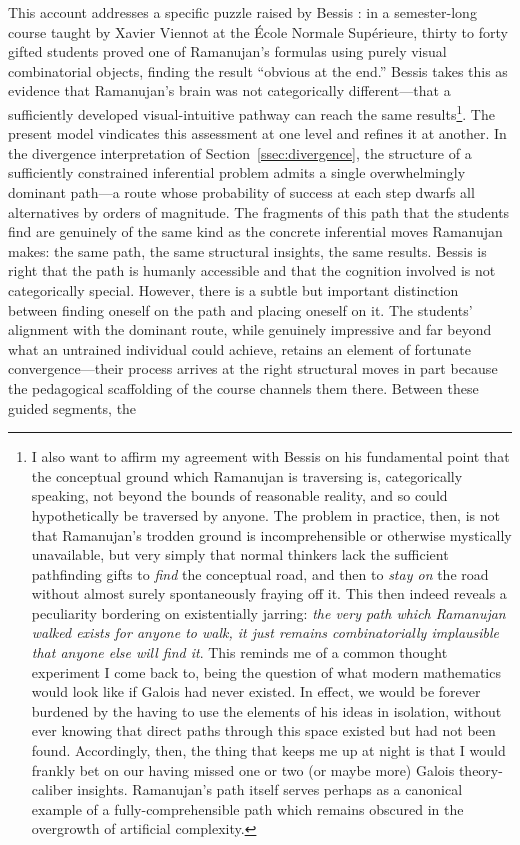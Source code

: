 \documentclass{article}
\begin{document}
This account addresses a specific puzzle raised by Bessis \cite{bessis2024mathematica,bessis2025genes,bessis2026jaimungal}: in a semester-long course taught by Xavier Viennot at the \'Ecole Normale Sup\'erieure, thirty to forty gifted students proved one of Ramanujan's formulas using purely visual combinatorial objects, finding the result ``obvious at the end.'' Bessis takes this as evidence that Ramanujan's brain was not categorically different---that a sufficiently developed visual-intuitive pathway can reach the same results\footnote{I also want to affirm my agreement with Bessis \cite{bessis2024mathematica,bessis2025genes,bessis2026jaimungal} on his fundamental point that the conceptual ground which Ramanujan is traversing is, categorically speaking, not beyond the bounds of reasonable reality, and so could hypothetically be traversed by anyone. The problem in practice, then, is not that Ramanujan's trodden ground is incomprehensible or otherwise mystically unavailable, but very simply that normal thinkers lack the sufficient pathfinding gifts to \emph{find} the conceptual road, and then to \emph{stay on} the road without almost surely spontaneously fraying off it. This then indeed reveals a peculiarity bordering on existentially jarring: \emph{the very path which Ramanujan walked exists for anyone to walk, it just remains combinatorially implausible that anyone else will find it}. This reminds me of a common thought experiment I come back to, being the question of what modern mathematics would look like if Galois had never existed. In effect, we would be forever burdened by the having to use the elements of his ideas in isolation, without ever knowing that direct paths through this space existed but had not been found. Accordingly, then, the thing that keeps me up at night is that I would frankly bet on our having missed one or two (or maybe more) Galois theory-caliber insights. Ramanujan's path itself serves perhaps as a canonical example of a fully-comprehensible path which remains obscured in the overgrowth of artificial complexity.}. The present model vindicates this assessment at one level and refines it at another. In the divergence interpretation of Section~\ref{ssec:divergence}, the structure of a sufficiently constrained inferential problem admits a single overwhelmingly dominant path---a route whose probability of success at each step dwarfs all alternatives by orders of magnitude. The fragments of this path that the students find are genuinely of the same kind as the concrete inferential moves Ramanujan makes: the same path, the same structural insights, the same results. Bessis is right that the path is humanly accessible and that the cognition involved is not categorically special. However, there is a subtle but important distinction between finding oneself on the path and placing oneself on it. The students' alignment with the dominant route, while genuinely impressive and far beyond what an untrained individual could achieve, retains an element of fortunate convergence---their process arrives at the right structural moves in part because the pedagogical scaffolding of the course channels them there. Between these guided segments, the 
\end{document}
